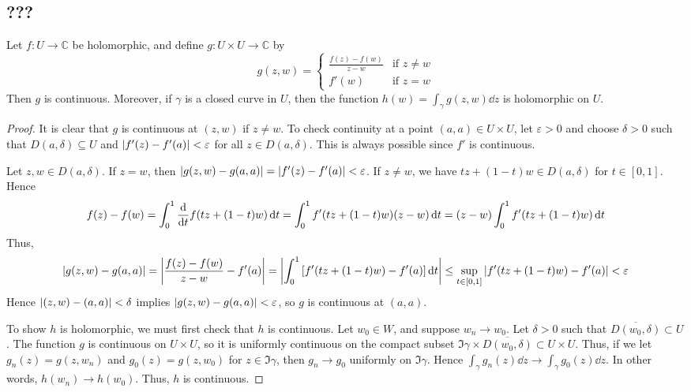 \subsection{???}
\begin{lemma}
	Let \( f \colon U \to \mathbb C \) be holomorphic, and define \( g \colon U \times U \to \mathbb C \) by
	\[ g(z,w) = \begin{cases}
		\frac{f(z) - f(w)}{z-w} & \text{if } z \neq w \\
		f'(w) & \text{if } z = w
	\end{cases} \]
	Then \( g \) is continuous.
	Moreover, if \( \gamma \) is a closed curve in \( U \), then the function \( h(w) = \int_\gamma g(z,w) \dd{z} \) is holomorphic on \( U \).
\end{lemma}
\begin{proof}
	It is clear that \( g \) is continuous at \( (z,w) \) if \( z \neq w \).
	To check continuity at a point \( (a,a) \in U \times U \), let \( \varepsilon > 0 \) and choose \( \delta > 0 \) such that \( D(a,\delta) \subseteq U \) and \( \abs{f'(z) - f'(a)} < \varepsilon \) for all \( z \in D(a,\delta) \).
	This is always possible since \( f' \) is continuous.

	Let \( z,w \in D(a,\delta) \).
	If \( z = w \), then \( \abs{g(z,w) - g(a,a)} = \abs{f'(z) - f'(a)} < \varepsilon \).
	If \( z \neq w \), we have \( tz + (1-t)w \in D(a,\delta) \) for \( t \in [0,1] \).
	Hence
	\[ f(z) - f(w) = \int_0^1 \dv{t} f(tz+(1-t)w) \dd{t} = \int_0^1 f'(tz+(1-t)w)(z-w) \dd{t} = (z-w) \int_0^1 f'(tz+(1-t)w) \dd{t} \]
	Thus,
	\[ \abs{g(z,w) - g(a,a)} = \abs{\frac{f(z) - f(w)}{z-w} - f'(a)} = \abs{\int_0^1 \qty[f'(tz+(1-t)w) - f'(a)] \dd{t}} \leq \sup_{t \in [0,1]} \abs{f'(tz+(1-t)w) - f'(a)} < \varepsilon \]
	Hence \( \abs{(z,w) - (a,a)} < \delta \) implies \( \abs{g(z,w) - g(a,a)} < \varepsilon \), so \( g \) is continuous at \( (a,a) \).

	To show \( h \) is holomorphic, we must first check that \( h \) is continuous.
	Let \( w_0 \in W \), and suppose \( w_n \to w_0 \).
	Let \( \delta > 0 \) such that \( \overline{D(w_0, \delta)} \subset U \).
	The function \( g \) is continuous on \( U \times U \), so it is uniformly continuous on the compact subset \( \Im \gamma \times \overline{D(w_0,\delta)} \subset U \times U \).
	Thus, if we let \( g_n(z) = g(z,w_n) \) and \( g_0(z) = g(z,w_0) \) for \( z \in \Im \gamma \), then \( g_n \to g_0 \) uniformly on \( \Im \gamma \).
	Hence \( \int_\gamma g_n(z) \dd{z} \to \int_\gamma g_0(z) \dd{z} \).
	In other words, \( h(w_n) \to h(w_0) \).
	Thus, \( h \) is continuous.


\end{proof}

